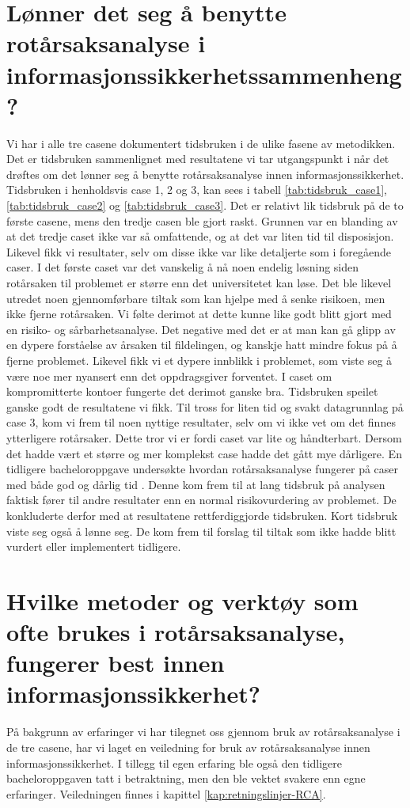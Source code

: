 \section{Lønner det seg å benytte rotårsaksanalyse i informasjonssikkerhetssammenheng?}
Vi har i alle tre casene dokumentert tidsbruken i de ulike fasene av metodikken. Det er tidsbruken sammenlignet med resultatene vi tar utgangspunkt i når det drøftes om det lønner seg å benytte rotårsaksanalyse innen informasjonssikkerhet. Tidsbruken i henholdsvis case 1, 2 og 3, kan sees i tabell \ref{tab:tidsbruk_case1}, \ref{tab:tidsbruk_case2} og \ref{tab:tidsbruk_case3}. Det er relativt lik tidsbruk på de to første casene, mens den tredje casen ble gjort raskt. Grunnen var en blanding av at det tredje caset ikke var så omfattende, og at det var liten tid til disposisjon. Likevel fikk vi resultater, selv om disse ikke var like detaljerte som i foregående caser. I det første caset var det vanskelig å nå noen endelig løsning siden rotårsaken til problemet er større enn det universitetet kan løse. Det ble likevel utredet noen gjennomførbare tiltak som kan hjelpe med å senke risikoen, men ikke fjerne rotårsaken. Vi følte derimot at dette kunne like godt blitt gjort med en risiko- og sårbarhetsanalyse. Det negative med det er at man kan gå glipp av en dypere forståelse av årsaken til fildelingen, og kanskje hatt mindre fokus på å fjerne problemet. Likevel fikk vi et dypere innblikk i problemet, som viste seg å være noe mer nyansert enn det oppdragsgiver forventet. I caset om kompromitterte kontoer fungerte det derimot ganske bra. Tidsbruken speilet ganske godt de resultatene vi fikk. Til tross for liten tid og svakt datagrunnlag på case 3, kom vi frem til noen nyttige resultater, selv om vi ikke vet om det finnes ytterligere rotårsaker. Dette tror vi er fordi caset var lite og håndterbart. Dersom det hadde vært et større og mer komplekst case hadde det gått mye dårligere. En tidligere bacheloroppgave undersøkte hvordan rotårsaksanalyse fungerer på caser med både god og dårlig tid \cite{RCARapport}. Denne kom frem til at lang tidsbruk på analysen faktisk fører til andre resultater enn en normal risikovurdering av problemet. De konkluderte derfor med at resultatene rettferdiggjorde tidsbruken. Kort tidsbruk viste seg også å lønne seg. De kom frem til forslag til tiltak som ikke hadde blitt vurdert eller implementert tidligere. 

\section{Hvilke metoder og verktøy som ofte brukes i rotårsaksanalyse, fungerer best innen informasjonssikkerhet?}
På bakgrunn av erfaringer vi har tilegnet oss gjennom bruk av rotårsaksanalyse i de tre casene, har vi laget en veiledning for bruk av rotårsaksanalyse innen informasjonssikkerhet. I tillegg til egen erfaring ble også den tidligere bacheloroppgaven \cite{RCARapport} tatt i betraktning, men den ble vektet svakere enn egne erfaringer. Veiledningen finnes i kapittel \ref{kap:retningslinjer-RCA}. 


